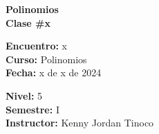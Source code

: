 \begin{center} \textbf
{
    \Large Polinomios \\ \vspace{2mm}Clase \#x
}
\end{center}

\begin{multicols}{2}
{
    \textbf{Encuentro:} x\\
    \textbf{Curso:} Polinomios\\
    \textbf{Fecha:} x de x de 2024\\
    \begin{flushright}
        \textbf{Nivel:} 5\\
        \textbf{Semestre:} I\\
        \textbf{Instructor:} Kenny Jordan Tinoco\\
    \end{flushright}
}
\end{multicols}

\thispagestyle{first-page-style}
